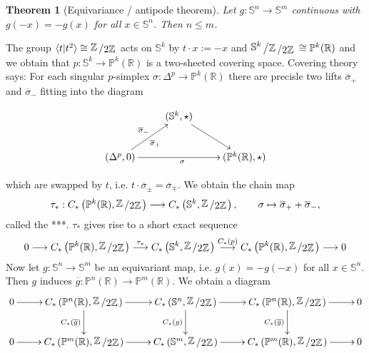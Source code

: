 \documentclass[11pt]{book}
\numberwithin{dummy}{section}
\newtheorem{theorem}{Theorem}[section]
\theoremstyle{nonumberbreak}
\newenvironment{pr}[1][]{\ifthenelse{\equal{#1}{}}{\proof}{\proof[#1]}\rm}{\endproof}
\newcommand{\Sph}{\mathbb{S}}
\newcommand{\la}{\longrightarrow}
\newcommand{\Z}{\mathbb{Z}}
\newcommand{\slant}[2]{{\raisebox{.1em}{$#1$}\left/\raisebox{-.1em}{$#2$}\right.}}
\begin{document}
\begin{spacing}{1.4}
\begin{theorem}[Equivariance / antipode theorem]
Let $g: \Sph^n \la \Sph^m$ continuous with $g(-x) = -g(x)$ for all $x \in \Sph^n$. Then $n \leqslant m$.
\end{theorem}

\begin{pr}
The group $\langle t \vert t^2 \rangle \cong \slant{\Z}{2 \Z}$ acts on $\Sph^k$ by $t \cdot x := -x$ and $\slant{\Sph^k}{\slant{\Z}{2\Z}} \cong \mathbb{P}^k(\mathbb{R})$ and we obtain that $p: \Sph^k \la \mathbb{P}^k(\mathbb{R})$ is a two-sheeted covering space. Covering theory says: For each singular $p$-simplex $\sigma: \Delta^p \la \mathbb{P}^k(\mathbb{R})$ there are precisle two lifts $\overline{\sigma}_+$ and $\overline{\sigma}_-$ fitting into the diagram

$$
\begin{xy}
\xymatrix{
& ( \Sph^k, \star) \ar[rd]  & \\ (\Delta^p,0) \ar[ru]_{\overline{\sigma}_+}^{\overline{\sigma}_-} \ar[rr]_{\sigma} && (\mathbb{P}^k(\mathbb{R}), \star) 
}
\end{xy}
$$
 
 which are swapped by $t$, i.e. $t \cdot \overline{\sigma}_{\pm} = \overline{\sigma}_{\mp}$. We obtain the chain map
 $$
 \tau_* : C_*\left( \mathbb{P}^k(\mathbb{R}), \slant{\Z}{2 \Z}\right) \la C_*\left( \Sph^k, \slant{\Z}{2 \Z} \right), \qquad \sigma \mapsto \overline{\sigma}_+ + \overline{\sigma}_-,$$
 called the ***. $\tau_*$ gives rise to a short exact sequence
 $$0 \la C_*\left( \mathbb{P}^k(\mathbb{R}), \slant{\Z}{2 \Z}\right) \overset{\tau_*}{\la} C_*\left( \Sph^k, \slant{\Z}{2 \Z} \right) \overset{C_*(p)}{\la} C_*\left( \mathbb{P}^k(\mathbb{R}), \slant{\Z}{2 \Z}\right) \la 0$$
 Now let $g: \Sph^n \la \Sph^m$ be an equivariant map, i.e. $g(x) = -g(-x)$ for all $x \in \Sph^n$. Then $g$ induces $\overline{g}: \mathbb{P}^n(\mathbb{R}) \la \mathbb{P}^m(\mathbb{R})$. We obtain a diagram
 $$
 \begin{xy}
 \xymatrix{
 0 \ar[r] & C_*\left( \mathbb{P}^n(\mathbb{R}), \slant{\Z}{2 \Z}\right) \ar[d]_{C_*(\overline{g})} \ar[r] & C_*\left( \Sph^n, \slant{\Z}{2\Z} \right) \ar[d]_{C_*(g)} \ar[r] & C_*\left( \mathbb{P}^n(\mathbb{R}), \slant{\Z}{2 \Z}\right) \ar[d]_{C_*(\overline{g})} \ar[r] & 0 \\
 0 \ar[r] & C_*\left( \mathbb{P}^m(\mathbb{R}), \slant{\Z}{2 \Z}\right) \ar[r] & C_*\left(\Sph^m, \slant{\Z}{2\Z}\right) \ar[r] & C_*\left( \mathbb{P}^m(\mathbb{R}), \slant{\Z}{2 \Z}\right) \ar[r] & 0
 }
 \end{xy}
 $$


\end{pr}
\end{spacing}
\end{document}
